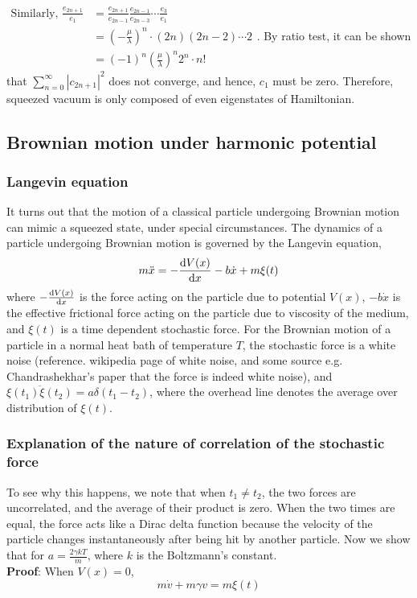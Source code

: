 \documentclass[12pt, twoside]{article}
\begin{document}
  $\begin{aligned}\text{Similarly, }\frac { e_{2n+1} } { e _ { 1 } } &= \frac { e_{2n+1} } { e_{2n-1} } \frac { e_{2n- 1} } { e_{2n- 3} } \cdots \frac { e _ { 3 } } { e _ { 1 } } \\
  &= \left( -\frac { \mu } { \lambda } \right) ^ { n } \cdot ( 2 n ) ( 2 n - 2) \cdots 2 \\  &= ( - 1 ) ^ { n } \left( \frac { \mu } { \lambda } \right) ^ { n } {2 ^ { n } \cdot n !  }\end{aligned}$. By ratio test, it can be shown that $\sum _ { n = 0 } ^ { \infty } |c_{2n+1}|^2$ does not converge, and hence, $c_1$ must be zero. Therefore, squeezed vacuum is only composed of even eigenstates of Hamiltonian.



\subsection{Brownian motion under harmonic potential}

\subsubsection{Langevin equation}
It turns out that the motion of a classical particle undergoing Brownian motion can mimic a squeezed state, under special circumstances. The dynamics of a particle undergoing Brownian motion is governed by the Langevin equation,\begin{equation}\label{eq:langevin}m \ddot{x} = -\derivative{V(x)}{x} - b \dot{x} + m \xi(t)\end{equation} where $-\derivative{V(x)}{x}$ is the force acting on the particle due to potential $V(x)$, $-b\dot{x}$ is the effective frictional force acting on the particle due to viscosity of the medium, and $\xi(t)$ is a time dependent stochastic force.
For the Brownian motion of a particle in a normal heat bath of temperature $T$, the stochastic force is a white noise (reference. wikipedia page of white noise, and some source e.g. Chandrashekhar's paper that the force is indeed white noise), and $\overline{\xi(t_1)\xi(t_2)} = a \delta(t_1 - t_2)$, where the overhead line denotes the average over distribution of $\xi(t)$.
\subsubsection{Explanation of the nature of correlation of the stochastic force} To see why this happens, we note that when $t_1 \neq t_2$, the two forces are uncorrelated, and the average of their product is zero. When the two times are equal, the force acts like a Dirac delta function because the velocity of the particle changes instantaneously after being hit by another particle. Now we show that for $a = \frac{2 \gamma k T}{m}$, where $k$ is the Boltzmann's constant.\\
\textbf{Proof}: When $V(x) = 0$,\begin{equation}\label{eq:lang_no_pot}
	m\dot{v}+m\gamma v = m \xi(t)
\end{equation} 
\end{document}
